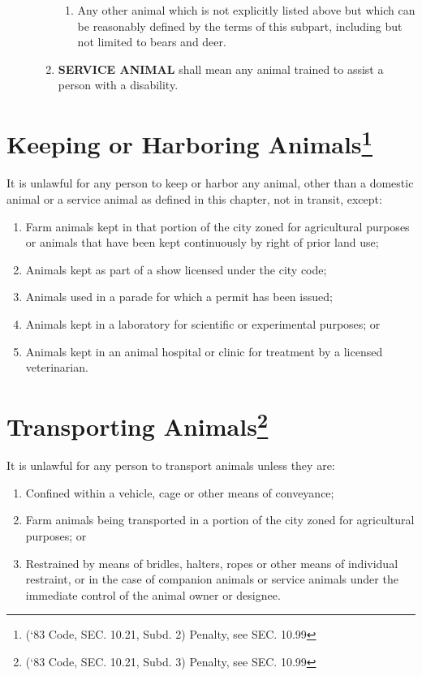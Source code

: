 \begin{description}
\begin{enumerate}[{\indent}1)]
\begin{enumerate}
            \item Any other animal which is not explicitly listed above but which can be reasonably defined by the terms of this subpart, including but not limited to bears and deer.
        \end{enumerate}
        \item \textbf{SERVICE ANIMAL} shall mean any animal trained to assist a person with a disability.
    \end{enumerate}
\end{description}

\section{Keeping or Harboring Animals\footnote{(‘83 Code, SEC. 10.21, Subd. 2)  Penalty, see SEC. 10.99}}
It is unlawful for any person to keep or harbor any animal, other than a domestic animal or a service animal as defined in this chapter, not in transit, except:
\begin{enumerate}[{\indent}A)]
    \item Farm animals kept in that portion of the city zoned for agricultural purposes or animals that have been kept continuously by right of prior land use;
    \item Animals kept as part of a show licensed under the city code;
    \item Animals used in a parade for which a permit has been issued;
    \item Animals kept in a laboratory for scientific or experimental purposes; or
    \item Animals kept in an animal hospital or clinic for treatment by a licensed veterinarian.
\end{enumerate}

\section{Transporting Animals\footnote{(‘83 Code, SEC. 10.21, Subd. 3)  Penalty, see SEC. 10.99}}
It is unlawful for any person to transport animals unless they are:
\begin{enumerate}[{\indent}A)]
    \item Confined within a vehicle, cage or other means of conveyance;
    \item Farm animals being transported in a portion of the city zoned for agricultural purposes; or
    \item Restrained by means of bridles, halters, ropes or other means of individual restraint, or in the case of companion animals or service animals under the immediate control of the animal owner or designee.
\end{enumerate}

